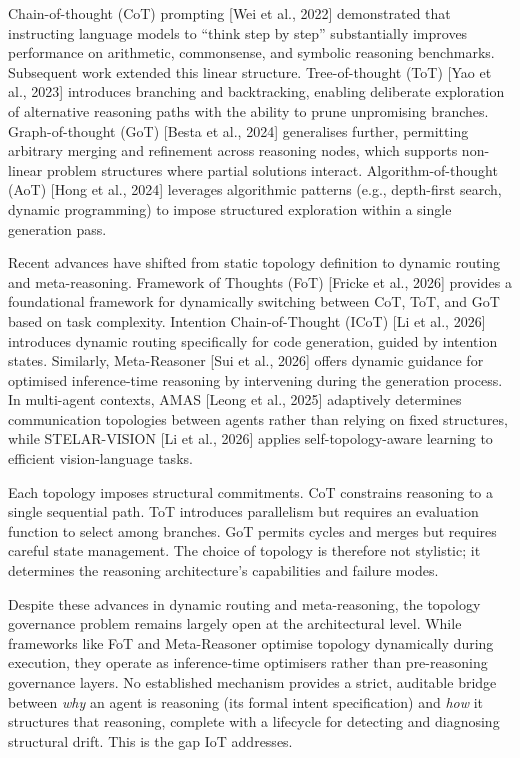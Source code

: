 \documentclass[11pt,a4paper]{article}
\begin{document}
Chain-of-thought (CoT) prompting {[}Wei et al., 2022{]} demonstrated
that instructing language models to ``think step by step'' substantially
improves performance on arithmetic, commonsense, and symbolic reasoning
benchmarks. Subsequent work extended this linear structure.
Tree-of-thought (ToT) {[}Yao et al., 2023{]} introduces branching and
backtracking, enabling deliberate exploration of alternative reasoning
paths with the ability to prune unpromising branches. Graph-of-thought
(GoT) {[}Besta et al., 2024{]} generalises further, permitting arbitrary
merging and refinement across reasoning nodes, which supports non-linear
problem structures where partial solutions interact.
Algorithm-of-thought (AoT) {[}Hong et al., 2024{]} leverages algorithmic
patterns (e.g., depth-first search, dynamic programming) to impose
structured exploration within a single generation pass.

Recent advances have shifted from static topology definition to dynamic
routing and meta-reasoning. Framework of Thoughts (FoT) {[}Fricke et
al., 2026{]} provides a foundational framework for dynamically switching
between CoT, ToT, and GoT based on task complexity. Intention
Chain-of-Thought (ICoT) {[}Li et al., 2026{]} introduces dynamic routing
specifically for code generation, guided by intention states. Similarly,
Meta-Reasoner {[}Sui et al., 2026{]} offers dynamic guidance for
optimised inference-time reasoning by intervening during the generation
process. In multi-agent contexts, AMAS {[}Leong et al., 2025{]}
adaptively determines communication topologies between agents rather
than relying on fixed structures, while STELAR-VISION {[}Li et al.,
2026{]} applies self-topology-aware learning to efficient
vision-language tasks.

Each topology imposes structural commitments. CoT constrains reasoning
to a single sequential path. ToT introduces parallelism but requires an
evaluation function to select among branches. GoT permits cycles and
merges but requires careful state management. The choice of topology is
therefore not stylistic; it determines the reasoning architecture's
capabilities and failure modes.

Despite these advances in dynamic routing and meta-reasoning, the
topology governance problem remains largely open at the architectural
level. While frameworks like FoT and Meta-Reasoner optimise topology
dynamically during execution, they operate as inference-time optimisers
rather than pre-reasoning governance layers. No established mechanism
provides a strict, auditable bridge between \emph{why} an agent is
reasoning (its formal intent specification) and \emph{how} it structures
that reasoning, complete with a lifecycle for detecting and diagnosing
structural drift. This is the gap IoT addresses.
\end{document}

